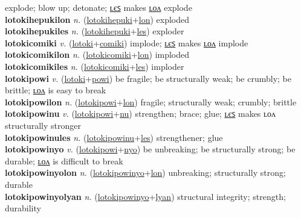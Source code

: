 explode; blow up; detonate; \hyperref[lotokihepukiles]{ʟєꜱ} makes \hyperref[lotokihepukilon]{ʟᴏᴧ} explode \label{lotokihepuki} \\
\textbf{lotokihepukilon} \textit{n.} (\hyperref[lotokihepuki]{lotokihepuki}+\hyperref[lon]{lon})
exploded \label{lotokihepukilon} \\
\textbf{lotokihepukiles} \textit{n.} (\hyperref[lotokihepuki]{lotokihepuki}+\hyperref[les]{les})
exploder \label{lotokihepukiles} \\
\textbf{lotokicomiki} \textit{v.} (\hyperref[lotoki]{lotoki}+\hyperref[comiki]{comiki})
implode; \hyperref[lotokicomikiles]{ʟєꜱ} makes \hyperref[lotokicomikilon]{ʟᴏᴧ} implode \label{lotokicomiki} \\
\textbf{lotokicomikilon} \textit{n.} (\hyperref[lotokicomiki]{lotokicomiki}+\hyperref[lon]{lon})
imploded \label{lotokicomikilon} \\
\textbf{lotokicomikiles} \textit{n.} (\hyperref[lotokicomiki]{lotokicomiki}+\hyperref[les]{les})
imploder \label{lotokicomikiles} \\
\textbf{lotokipowi} \textit{v.} (\hyperref[lotoki]{lotoki}+\hyperref[powi]{powi})
be fragile; be structurally weak; be crumbly; be brittle; \hyperref[lotokipowilon]{ʟᴏᴧ} is easy to break \label{lotokipowi} \\
\textbf{lotokipowilon} \textit{n.} (\hyperref[lotokipowi]{lotokipowi}+\hyperref[lon]{lon})
fragile; structurally weak; crumbly; brittle \label{lotokipowilon} \\
\textbf{lotokipowinu} \textit{v.} (\hyperref[lotokipowi]{lotokipowi}+\hyperref[nu]{nu})
strengthen; brace; glue; \hyperref[lotokipowinules]{ʟєꜱ} makes ʟᴏᴧ structurally stronger \label{lotokipowinu} \\
\textbf{lotokipowinules} \textit{n.} (\hyperref[lotokipowinu]{lotokipowinu}+\hyperref[les]{les})
strengthener; glue \label{lotokipowinules} \\
\textbf{lotokipowinyo} \textit{v.} (\hyperref[lotokipowi]{lotokipowi}+\hyperref[nyo]{nyo})
be unbreaking; be structurally strong; be durable; \hyperref[lotokipowinyolon]{ʟᴏᴧ} is difficult to break \label{lotokipowinyo} \\
\textbf{lotokipowinyolon} \textit{n.} (\hyperref[lotokipowinyo]{lotokipowinyo}+\hyperref[lon]{lon})
unbreaking; structurally strong; durable \label{lotokipowinyolon} \\
\textbf{lotokipowinyolyan} \textit{n.} (\hyperref[lotokipowinyo]{lotokipowinyo}+\hyperref[lyan]{lyan})
structural integrity; strength; durability \label{lotokipowinyolyan} \\
